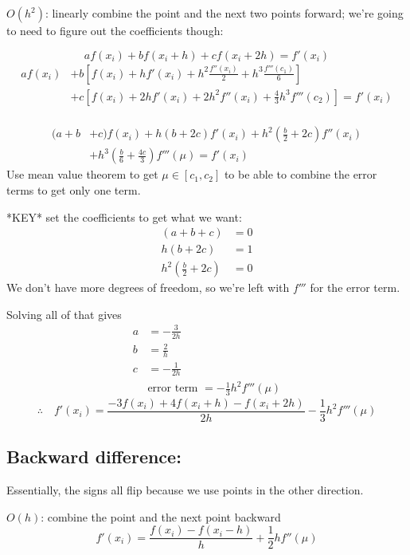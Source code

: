 \documentclass[12pt, answers]{exam}
\begin{document}
\underline{$O(h^2)$}: linearly combine the point and the next two points forward; we're going to need to figure out the coefficients though:

\[
a f(x_i) + b f(x_i + h) + c f(x_i + 2h) = f'(x_i) \]
%
\ifprintanswers
\begin{align*}
a f(x_i) &+ b[f(x_i) + hf'(x_i) + h^2\frac{f''(x_i)}{2} + h^3\frac{f'''(c_1)}{6}] \nonumber \\
&+ c[f(x_i) + 2h f'(x_i) + 2 h^2 f''(x_i) + \frac{4}{3} h^3 f'''(c_2)] =f'(x_i)
\end{align*}
\else
\\\vspace*{3em}
\fi
\begin{align*}
(a + b &+ c)f(x_i) + h(b + 2c)f'(x_i) + h^2(\frac{b}{2} + 2c) f''(x_i) \\
&+ h^3(\frac{b}{6} +  \frac{4c}{3}) f'''(\mu) = f'(x_i)
\end{align*}
%
Use mean value theorem to get $\mu \in [c_1, c_2]$ to be able to combine the error terms to get only one term.

*KEY* set the coefficients to get what we want:
%
\begin{align*}
(a + b + c) &= 0\\
h(b + 2c) &= 1\\
h^2(\frac{b}{2} + 2c) &= 0
\end{align*}
%
We don't have more degrees of freedom, so we're left with $f'''$ for the error term. 

Solving all of that gives
%
\begin{align*}
a &= -\frac{3}{2h} \\
b &= \frac{2}{h} \\
c &= -\frac{1}{2h} \\
&\text{error term } = -\frac{1}{3}h^2 f'''(\mu) 
\end{align*}
\ifprintanswers
\[
\therefore \quad \boxed{f'(x_i) = \frac{-3 f(x_i) + 4f(x_i + h) - f(x_i + 2h)}{2h} -\frac{1}{3}h^2 f'''(\mu)}\]
\else
\vspace*{2em}
\fi


\subsection*{Backward difference:}
Essentially, the signs all flip because we use points in the other direction.

\underline{$O(h)$}: combine the point and the next point backward
\[f'(x_i) = \frac{f(x_i) - f(x_i - h)}{h} + \frac{1}{2}hf''(\mu)\]
\end{document}
